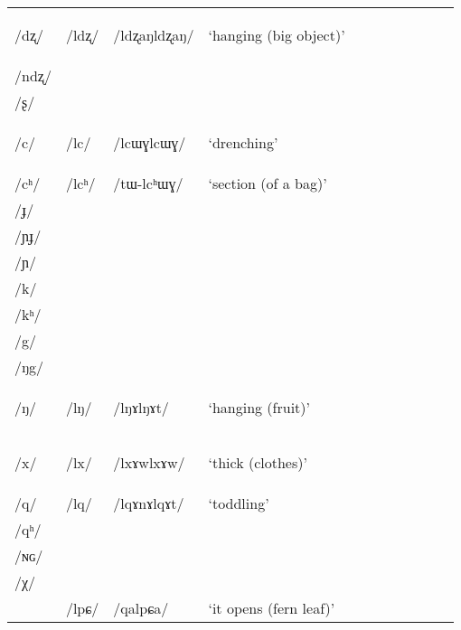 \documentclass[12pt]{article}
\newcommand{\ipa}[1]{\mbox{\phon/#1/}}
\newcommand{\deux}[1]{\ipa{#1}\addtocounter{2clusters}{1}}
\newcommand{\trois}[1]{\ipa{#1}\addtocounter{3clusters}{1}}
\newcommand{\idph}[1]{\cellcolor{gray}\textbf{#1}}
\newcommand{\resetcounters}[2]{
\newcounter{#1}
\newcounter{#2}
 \setcounter{#1}{\value{2clusters}}
  \setcounter{#2}{\value{3clusters}}
 \setcounter{2clusters}{0}
  \setcounter{3clusters}{0}
}
\begin{document}
\begin{table}
\begin{tabular}{lllllllllll}
\ipa{dʐ}  & 	 \deux{ldʐ} \idph{}  & 	 \ipa{ldʐaŋldʐaŋ}  & 	 `hanging (big object)'  & 	\\
\ipa{ndʐ}  & 	  & 	  & 	  & 	\\
\ipa{ʂ}  & 	  & 	  & 	  & 	\\
\ipa{c}  & 	 \deux{lc} \idph{}  & 	 \ipa{lcɯɣlcɯɣ}  & 	 `drenching'  & 	\\
\ipa{cʰ}  & 	 \deux{lcʰ}  & 	 \ipa{tɯ-lcʰɯɣ}  & 	 `section (of a bag)'  & 	\\
\ipa{ɟ}  & 	  & 	  & 	  & 	\\
\ipa{ɲɟ}  & 	  & 	  & 	  & 	\\
\ipa{ɲ}  & 	  & 	  & 	  & 	\\
\ipa{k}  & 	  & 	  & 	  & 	\\
\ipa{kʰ}  & 	  & 	  & 	  & 	\\
\ipa{g}  & 	  & 	  & 	  & 	\\
\ipa{ŋg}  & 	  & 	  & 	  & 	\\
\ipa{ŋ}  & 	 \deux{lŋ} \idph{}  & 	 \ipa{lŋɤlŋɤt}  & 	 `hanging (fruit)'  & 	\\
\ipa{x}  & 	 \deux{lx} \idph{}  & 	 \ipa{lxɤwlxɤw}  & 	 `thick (clothes)'  & 	\\
\ipa{q}  & 	 \deux{lq}  & 	 \ipa{lqɤnɤlqɤt}  & 	 `toddling'  & 	\\
\ipa{qʰ}  & 	  & 	  & 	  & 	\\
\ipa{ɴɢ}  & 	  & 	  & 	  & 	\\
\ipa{χ}  & 	  & 	  & 	  & 	\\
\midrule 
 &\trois{lpɕ} 	 & 	\ipa{qalpɕa}  & 	 `it opens (fern leaf)' \\ 
\bottomrule
\end{tabular}%
\end{table}
 \resetcounters{2lC}{3lC} %
\end{document}
